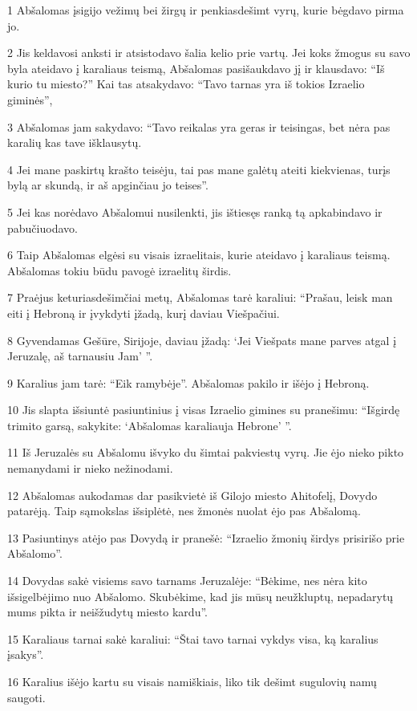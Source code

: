 \par 1 Abšalomas įsigijo vežimų bei žirgų ir penkiasdešimt vyrų, kurie bėgdavo pirma jo. 
\par 2 Jis keldavosi anksti ir atsistodavo šalia kelio prie vartų. Jei koks žmogus su savo byla ateidavo į karaliaus teismą, Abšalomas pasišaukdavo jį ir klausdavo: “Iš kurio tu miesto?” Kai tas atsakydavo: “Tavo tarnas yra iš tokios Izraelio giminės”, 
\par 3 Abšalomas jam sakydavo: “Tavo reikalas yra geras ir teisingas, bet nėra pas karalių kas tave išklausytų. 
\par 4 Jei mane paskirtų krašto teisėju, tai pas mane galėtų ateiti kiekvienas, turįs bylą ar skundą, ir aš apginčiau jo teises”. 
\par 5 Jei kas norėdavo Abšalomui nusilenkti, jis ištiesęs ranką tą apkabindavo ir pabučiuodavo. 
\par 6 Taip Abšalomas elgėsi su visais izraelitais, kurie ateidavo į karaliaus teismą. Abšalomas tokiu būdu pavogė izraelitų širdis. 
\par 7 Praėjus keturiasdešimčiai metų, Abšalomas tarė karaliui: “Prašau, leisk man eiti į Hebroną ir įvykdyti įžadą, kurį daviau Viešpačiui. 
\par 8 Gyvendamas Gešūre, Sirijoje, daviau įžadą: ‘Jei Viešpats mane parves atgal į Jeruzalę, aš tarnausiu Jam’ ”. 
\par 9 Karalius jam tarė: “Eik ramybėje”. Abšalomas pakilo ir išėjo į Hebroną. 
\par 10 Jis slapta išsiuntė pasiuntinius į visas Izraelio gimines su pranešimu: “Išgirdę trimito garsą, sakykite: ‘Abšalomas karaliauja Hebrone’ ”. 
\par 11 Iš Jeruzalės su Abšalomu išvyko du šimtai pakviestų vyrų. Jie ėjo nieko pikto nemanydami ir nieko nežinodami. 
\par 12 Abšalomas aukodamas dar pasikvietė iš Gilojo miesto Ahitofelį, Dovydo patarėją. Taip sąmokslas išsiplėtė, nes žmonės nuolat ėjo pas Abšalomą. 
\par 13 Pasiuntinys atėjo pas Dovydą ir pranešė: “Izraelio žmonių širdys prisirišo prie Abšalomo”. 
\par 14 Dovydas sakė visiems savo tarnams Jeruzalėje: “Bėkime, nes nėra kito išsigelbėjimo nuo Abšalomo. Skubėkime, kad jis mūsų neužkluptų, nepadarytų mums pikta ir neišžudytų miesto kardu”. 
\par 15 Karaliaus tarnai sakė karaliui: “Štai tavo tarnai vykdys visa, ką karalius įsakys”. 
\par 16 Karalius išėjo kartu su visais namiškiais, liko tik dešimt sugulovių namų saugoti. 
